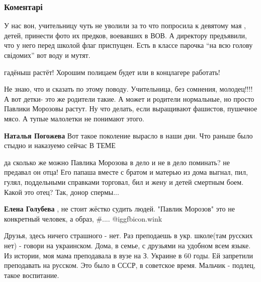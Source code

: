  
 
 
 
 
\subsubsection{Коментарі}

\begin{itemize} %

У нас вон, учительницу чуть не уволили за то что попросила к девятому мая
, детей, принести фото их предков, воевавших в ВОВ. А директору предъявили, что
у него перед школой флаг приспущен. Есть в классе парочка \enquote{на всю
голову свідомих} вот воду и мутят.


гадёныш растёт! Хорошим полицаем будет или в концлагере работать!


Не знаю, что и сказать по этому поводу. Учительница, без сомнения, молодец!!!!
А вот детки- это же родители такие. А может и родители нормальные, но просто Павлики Морозовы растут.
Ну что делать, если выращивают фашистов, пушечное мясо. А тупые малолетки не понимают этого.

\begin{itemize} %
\textbf{Наталья Погожева} Вот такое поколение вырасло в наши дни. Что раньше было стыдно и наказуемо сейчас В ТЕМЕ


да сколько же можно Павлика Морозова в дело и не в дело поминать? не предавал
он отца! Его папаша вместе с братом и матерью из дома выгнал, пил, гулял,
поддельными справками торговал, бил и жену и детей смертным боем. Какой это
отец? Так, донор спермы...

\textbf{Елена Голубева} , не стоит жёстко судить людей. "Павлик Морозов" это не конкретный человек, а образ, \#....  @igg{fbicon.wink} 
\end{itemize} %


Друзья, здесь ничего страшного - нет. Раз преподаешь в укр. школе(там русских нет)
- говори на украинском. Дома, в семье, с друзьями на удобном всем языке. Из
истории, моя мама преподавала в вузе на З. Украине в 60 годы. Ей запретили
преподавать на русском. Это было в СССР, в советское время. Мальчик - подлец, такое
воспитание.


\end{itemize}
